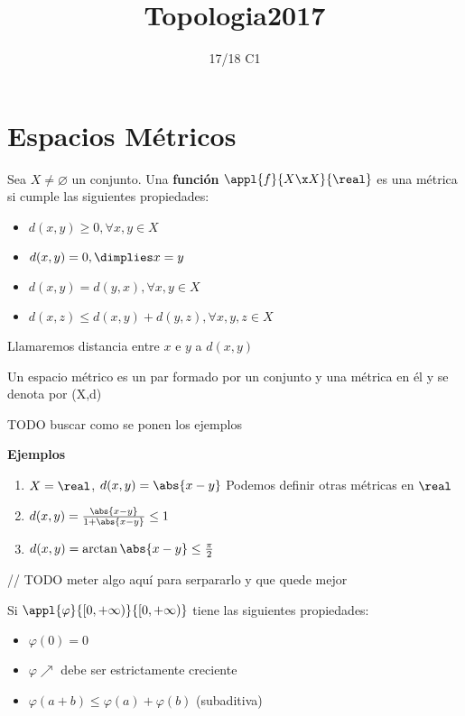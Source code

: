 \documentclass[palatino]{apuntes}
\title{Topologia2017}
\author{}
\date{17/18 C1}
\begin{document}
\pagestyle{plain}
\maketitle

\tableofcontents
\newpage

\chapter{Espacios Métricos}

\begin{defn}[Métrica]
	Sea $ X \neq \varnothing $ un conjunto. Una \textbf{función} $ \appl{f}{X \x X}{\real} $ es una métrica si cumple las siguientes propiedades:

	\begin{itemize}
		\item $ d(x,y) \geq 0, \forall x, y \in X $
		\item $ d(x,y) = 0, \dimplies x = y $
		\item $ d(x,y) = d(y,x), \forall x, y \in X $
		\item $ d(x,z) \leq d(x,y) + d(y,z), \forall x, y, z \in X $
	\end{itemize}
	
	Llamaremos distancia entre $ x $ e $ y $ a $ d(x,y) $
\end{defn}

\begin{defn}
	Un espacio métrico es un par formado por un conjunto y una métrica en él y se denota por (X,d)
\end{defn}


TODO buscar como se ponen los ejemplos

\textbf{Ejemplos}
\begin{enumerate}
	\item $ X = \real $, $d(x,y) = \abs{x-y} $ Podemos definir otras métricas en $ \real $
	\item $ d(x,y)= \frac{\abs{x-y}}{1+\abs{x-y}} \leq 1 $
	\item $ d(x,y)= \arctan{\abs{x-y}} \leq \frac{\pi}{2} $
\end{enumerate}



// TODO meter algo aquí para serpararlo y que quede mejor

Si $ \appl{\varphi}{ [ 0 , + \infty ) }{ [ 0 , + \infty ) } $ tiene las siguientes propiedades:

\begin{itemize}
	\item $ \varphi(0) = 0 $
	\item $ \varphi \nearrow$ debe ser estrictamente creciente
	\item $ \varphi(a+b) \leq \varphi(a) + \varphi(b) $ (subaditiva)
\end{itemize}
\end{document}
